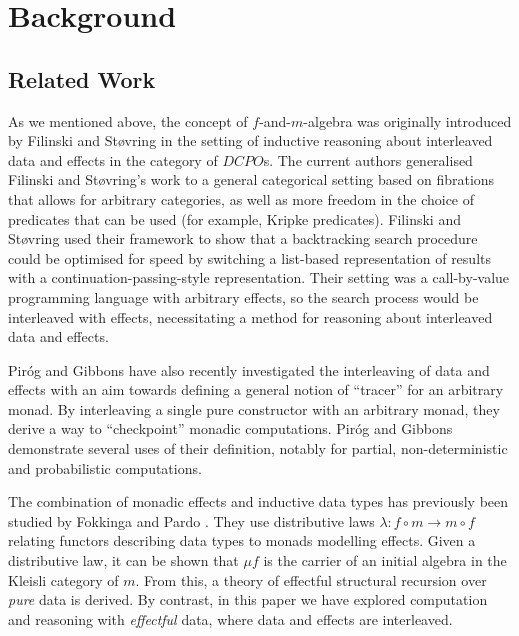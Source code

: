 \documentclass{jfp1}
\begin{document}
\section{Background}
\label{sec:background}

\subsection{Related Work}

As we mentioned above, the concept of $f$-and-$m$-algebra was
originally introduced by Filinski and St\o{}vring
\cite{filinski07inductive} in the setting of inductive reasoning about
interleaved data and effects in the category of $\mathit{DCPO}$s. The
current authors \cite{atkey12fibrational} generalised Filinski and
St\o{}vring's work to a general categorical setting based on
fibrations that allows for arbitrary categories, as well as more
freedom in the choice of predicates that can be used (for example,
Kripke predicates). Filinski and St\o{}vring used their framework to
show that a backtracking search procedure could be optimised for speed
by switching a list-based representation of results with a
continuation-passing-style representation. Their setting was a
call-by-value programming language with arbitrary effects, so the
search process would be interleaved with effects, necessitating a
method for reasoning about interleaved data and effects.

Pir{\'o}g and Gibbons \cite{pirog12tracing} have also recently
investigated the interleaving of data and effects with an aim towards
defining a general notion of ``tracer'' for an arbitrary monad. By
interleaving a single pure constructor with an arbitrary monad, they
derive a way to ``checkpoint'' monadic computations. Pir{\'o}g and
Gibbons demonstrate several uses of their definition, notably for
partial, non-deterministic and probabilistic computations.


The combination of monadic effects and inductive data types has
previously been studied by Fokkinga \cite{fokkinga94monadic} and Pardo
\cite{pardo04combining}. They use distributive laws $\lambda : f \circ
m \rightarrow m \circ f$ relating functors describing data types to
monads modelling effects. Given a distributive law, it can be shown
that $\mu f$ is the carrier of an initial algebra in the Kleisli
category of $m$. From this, a theory of effectful structural recursion
over \emph{pure} data is derived. By contrast, in this paper we have
explored computation and reasoning with \emph{effectful} data, where
data and effects are interleaved.
\end{document}
